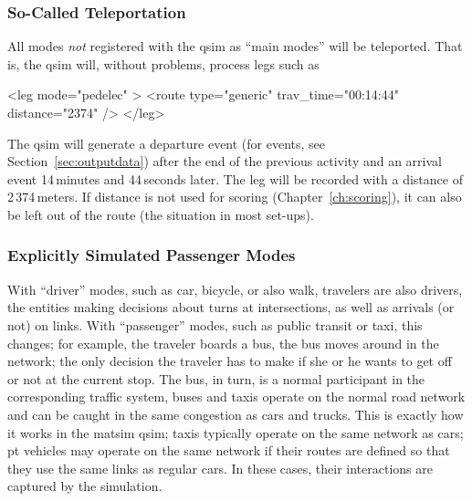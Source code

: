 \subsubsection{So-Called Teleportation}
\label{sec:teleportation-qsim}
All modes \emph{not} registered with the \gls{qsim} as ``main modes'' will be teleported.  That is, the \gls{qsim} will, without problems, process legs such as
\begin{xml}
<leg mode="pedelec" >
   <route type="generic" trav_time="00:14:44" distance="2374" />
</leg>
\end{xml}
The \gls{qsim} will generate a departure event (for events, see Section~\ref{sec:outputdata}) after the end of the previous activity and an arrival event 14\,minutes and 44\,seconds later.  The leg will be recorded with a distance of 2\,374\,meters.  If  distance is not used for  scoring (\cf Chapter~\ref{ch:scoring}), it can also be left out of the route (the situation in most set-ups).

\subsubsection{Explicitly Simulated Passenger Modes}



With ``driver'' modes, such as car, bicycle, or also walk,  travelers are also drivers, \ie the entities making decisions about turns at intersections, as well as arrivals (or not) on links.
%
With ``passenger'' modes, such as public transit or taxi, this changes; for example, the traveler boards a bus, the bus moves around in the network; the only decision the traveler has to make if she or he wants to get off or not at the current stop.  The bus, in turn, is a normal participant in the corresponding traffic system, \ie buses and taxis operate on the normal road network and can be caught in the same congestion as cars and trucks.  
%
This is exactly how it works in the \gls{matsim} \gls{qsim}; taxis typically operate on the same network as cars; pt vehicles may operate on the same network if their routes are defined so that they use the same links as regular cars. 
In these cases, their interactions are captured by the simulation. 


